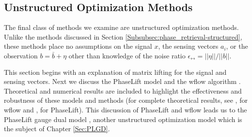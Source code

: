 \subsection{Unstructured Optimization Methods}	 	\label{Subsubsec:phase_retrieval-unstructured}


The final class of methods we examine are unstructured optimization methods.  Unlike the methods discussed in Section \ref{Subsubsec:phase_retrieval-structured}, these methods place no assumptions on the signal $x$, the sensing vectors $a_i$, or the observation $b = \bar{b} + \eta$ other than knowledge of the noise ratio $\epsilon_\rel = ||\eta|| / ||b||$.

This section begins with an explanation of matrix lifting for the signal and sensing vectors.  Next we discuss the PhaseLift model \cite{DBLP:journals/siamis/CandesESV13} and the wflow algorithm \cite{DBLP:journals/tit/CandesLS15}.   Theoretical and numerical results are included to highlight the effectiveness and robustness of these models and methods (for complete theoretical results, see \cite{DBLP:journals/tit/CandesLS15},  \cite{sun2016geometric} for wflow and \cite{candes2014solving}, \cite{candes2013phaselift} for PhaseLift).  This discussion of PhaseLift and wflow leads us to the PhaseLift gauge dual model \cite{DBLP:journals/siamsc/FriedlanderM16}, another unstructured optimization model which is the subject of Chapter \ref{Sec:PLGD}.






